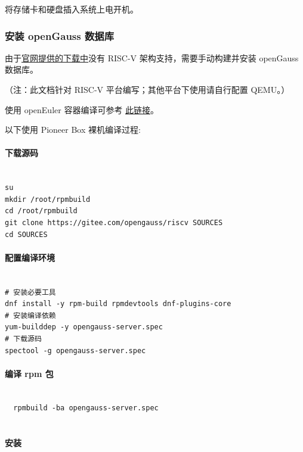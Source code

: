 \documentclass{article}
\begin{document}
将存储卡和硬盘插入系统上电开机。

\subsubsection{安装 openGauss 数据库}

由于\href{https://opengauss.org/zh/download/}{官网提供的下载中}没有 RISC-V 架构支持，需要手动构建并安装 openGauss 数据库。

（注：此文档针对 RISC-V 平台编写；其他平台下使用请自行配置 QEMU。）

使用 openEuler 容器编译可参考 \href{https://github.com/QA-Team-lo/dbtest/blob/main/opengauss/install.md}{此链接}。

以下使用 Pioneer Box 裸机编译过程:

\paragraph{下载源码}

\begin{verbatim}
  
su 
mkdir /root/rpmbuild
cd /root/rpmbuild
git clone https://gitee.com/opengauss/riscv SOURCES
cd SOURCES

\end{verbatim}

\paragraph{配置编译环境}

\begin{verbatim}
  
# 安装必要工具
dnf install -y rpm-build rpmdevtools dnf-plugins-core
# 安装编译依赖
yum-builddep -y opengauss-server.spec
# 下载源码
spectool -g opengauss-server.spec

\end{verbatim}

\paragraph{编译 rpm 包}

\begin{verbatim}
  
  rpmbuild -ba opengauss-server.spec
  
\end{verbatim}

\paragraph{安装}
\end{document}
